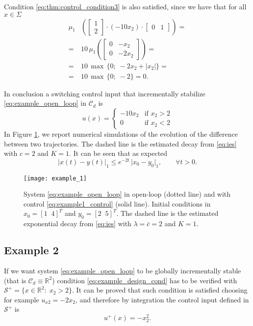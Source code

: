 \documentclass[letterpaper, 10 pt, conference]{ieeeconf}
\begin{document}
Condition \eqref{eq:thm:control_condition3} is also satisfied, since we have that for all $x\in\Sigma$
\begin{equation*}
\begin{split}
\mu_1&\left(
\begin{bmatrix}
1\\
2
\end{bmatrix}
\cdot (-10x_2) \cdot
\begin{bmatrix}
0 & 1
\end{bmatrix} \right)=\\
=& 10\,\mu_1\left( 
\begin{bmatrix}
0 & -x_2\\
0 & -2x_2
\end{bmatrix} 
\right)=\\
=& 10\, \max\,\{ 0;\; -2x_2+|x_2|\}=\\
=& 10\, \max\,\{ 0;\; -2\}=0.
\end{split}
\end{equation*}



In conclusion a switching control input that incrementally stabilize \eqref{eq:example_open_loop} in $\mathcal{C}_d$ is
\begin{equation}
\label{eq:example1_control}
u(x)=
\begin{cases}
-10x_2 & \mbox{if } x_2>2\\
0 & \mbox{if } x_2<2
\end{cases}
\end{equation}
In Figure \ref{fig:example1_sim}, we report numerical simulations of the evolution of the difference between two trajectories. The dashed line is the estimated decay from \eqref{eq:ies} with $c=2$ and $K=1$. It can be seen that as expected
\begin{equation*}
\lvert x(t)-y(t)\rvert_1\leq e^{-2t}\,\lvert x_0-y_0\rvert_1, \qquad \forall t>0.
\end{equation*}

\begin{figure}[t]
\centering 
{\texttt{[image: example\_1]}}
\caption{System \eqref{eq:example_open_loop} in open-loop (dotted line) and with control \eqref{eq:example1_control} (solid line). Initial conditions in $x_0=[1\;\;4]^T$ and $y_0=[2\;\;5]^T$. The dashed line is the estimated exponential decay from \eqref{eq:ies} with $\lambda=\bar{c}=2$ and $K=1$. } 
\label{fig:example1_sim}
\end{figure}

\subsection{Example 2}
\label{sec:example_2}
If we want system \eqref{eq:example_open_loop} to be globally incrementally stable (that is $\mathcal{C}_d\equiv\mathbb{R}^2$) condition \eqref{eq:example_design_cond} has to be verified with $\mathcal{S}^+=\{x\in\mathbb{R}^2:\; x_2>2\}$. It can be proved that such condition is satisfied choosing for example $u_{x2}=-2x_2$, and therefore by integration the control input defined in $\mathcal{S}^+$ is
\begin{equation*}
u^+(x)=-x_2^2.
\end{equation*}
\end{document}

